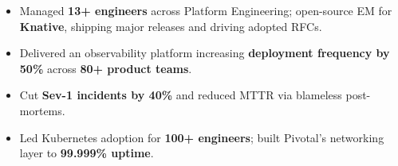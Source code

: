 \documentclass[10pt,a4paper,ragged2e,withhyper]{altacv}
\begin{document}
\fi

\divider

\begin{itemize}
\item Managed \textbf{13+ engineers} across Platform Engineering; open-source EM for \textbf{Knative}, shipping major releases and driving adopted RFCs.
\item Delivered an observability platform increasing \textbf{deployment frequency by 50\%} across \textbf{80+ product teams}.
\item Cut \textbf{Sev-1 incidents by 40\%} and reduced MTTR via blameless post-mortems.
\item Led Kubernetes adoption for \textbf{100+ engineers}; built Pivotal's networking layer to \textbf{99.999\% uptime}.
\end{itemize}

\vspace{0.5em}

\end{document}

